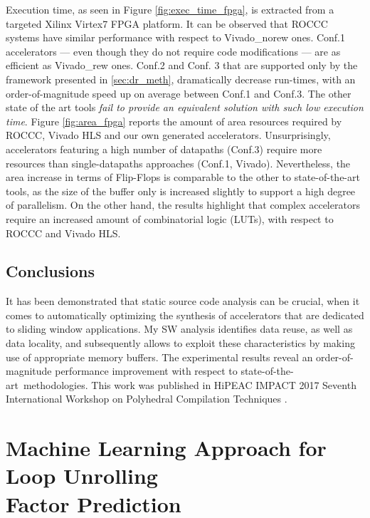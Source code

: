 \documentclass[]{usiinfthesis}
\newcommand{\SoTA}{{state-of-the-art}}
\begin{document}
Execution time, as seen in Figure \ref{fig:exec_time_fpga}, is extracted from 
a targeted Xilinx Virtex7 FPGA platform. 
It can be observed that ROCCC systems have similar
performance with respect to Vivado\_norew ones. Conf.1 accelerators 
--- even though they do not require code modifications --- are as 
efficient as Vivado\_rew ones. Conf.2 and Conf. 3 that are
supported only by the framework presented in \ref{sec:dr_meth}, dramatically decrease
run-times, with an order-of-magnitude speed up on average between
Conf.1 and Conf.3. The other state of the art tools \emph{fail to 
provide an equivalent solution with such low execution time}.
Figure \ref{fig:area_fpga} reports the amount of area resources required by
ROCCC, Vivado HLS and our own generated accelerators.
Unsurprisingly, accelerators featuring a high number of datapaths (Conf.3) 
require more resources than single-datapaths approaches (Conf.1, Vivado). 
Nevertheless, the area increase in terms of Flip-Flops is comparable to 
the other to state-of-the-art tools, as the size of the buffer only is 
increased slightly to support a high degree of parallelism.
On the other hand, the results highlight that complex accelerators require 
an increased amount of combinatorial logic (LUTs), with respect to ROCCC 
and Vivado HLS.

\vspace{-0.3cm}
\subsection{Conclusions}

It has been demonstrated that static source code analysis can be crucial, when it comes to 
automatically optimizing the synthesis of accelerators that are dedicated to 
sliding window applications. My SW analysis identifies data reuse, as well as data locality,
and subsequently allows to exploit these characteristics by making use of appropriate
memory buffers. The experimental results reveal an order-of-magnitude performance 
improvement with respect to \SoTA\ methodologies. This work was published in 
HiPEAC IMPACT 2017 Seventh International Workshop on Polyhedral Compilation Techniques 
\cite{ZacharopoulosJan17}. 



%
%
%

\section[Machine Learning Approach for Loop Unrolling\\ Factor Prediction]
{Machine Learning Approach for Loop Unrolling\\ Factor Prediction}
\end{document}
